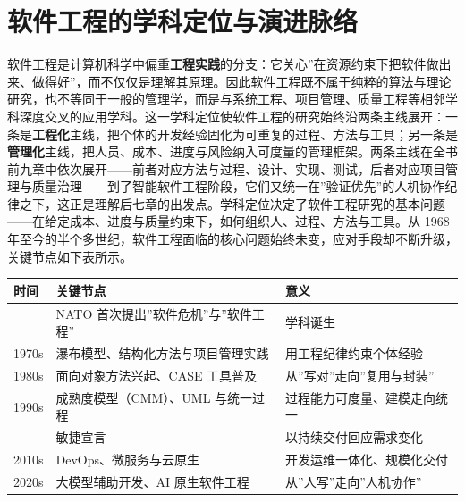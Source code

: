 \documentclass[
]{ctexbook}
\newcounter{none}
\begin{document}
\section{软件工程的学科定位与演进脉络}\label{ux8f6fux4ef6ux5de5ux7a0bux7684ux5b66ux79d1ux5b9aux4f4dux4e0eux6f14ux8fdbux8109ux7edc}

软件工程是计算机科学中偏重\textbf{工程实践}的分支：它关心''在资源约束下把软件做出来、做得好''，而不仅仅是理解其原理。因此软件工程既不属于纯粹的算法与理论研究，也不等同于一般的管理学，而是与系统工程、项目管理、质量工程等相邻学科深度交叉的应用学科。这一学科定位使软件工程的研究始终沿两条主线展开：一条是\textbf{工程化}主线，把个体的开发经验固化为可重复的过程、方法与工具；另一条是\textbf{管理化}主线，把人员、成本、进度与风险纳入可度量的管理框架。两条主线在全书前九章中依次展开------前者对应方法与过程、设计、实现、测试，后者对应项目管理与质量治理------到了智能软件工程阶段，它们又统一在''验证优先''的人机协作纪律之下，这正是理解后七章的出发点。学科定位决定了软件工程研究的基本问题------在给定成本、进度与质量约束下，如何组织人、过程、方法与工具。从
1968
年至今的半个多世纪，软件工程面临的核心问题始终未变，应对手段却不断升级，关键节点如下表所示。

{\def\LTcaptype{none} %
\begin{longtable}[]{@{}
  >{\raggedright\arraybackslash}p{}
  >{\raggedright\arraybackslash}p{}
  >{\raggedright\arraybackslash}p{}@{}}
\toprule\noalign{}
\begin{minipage}[b]{\linewidth}\raggedright
时间
\end{minipage} & \begin{minipage}[b]{\linewidth}\raggedright
关键节点
\end{minipage} & \begin{minipage}[b]{\linewidth}\raggedright
意义
\end{minipage} \\
\midrule\noalign{}
\endhead
\bottomrule\noalign{}
\endlastfoot
1968 & NATO 首次提出''软件危机''与''软件工程'' & 学科诞生 \\
1970s & 瀑布模型、结构化方法与项目管理实践 & 用工程纪律约束个体经验 \\
1980s & 面向对象方法兴起、CASE 工具普及 &
从''写对''走向''复用与封装'' \\
1990s & 成熟度模型（CMM）、UML 与统一过程 &
过程能力可度量、建模走向统一 \\
2001 & 敏捷宣言 & 以持续交付回应需求变化 \\
2010s & DevOps、微服务与云原生 & 开发运维一体化、规模化交付 \\
2020s & 大模型辅助开发、AI 原生软件工程 & 从''人写''走向''人机协作'' \\
\end{longtable}
}
\end{document}
